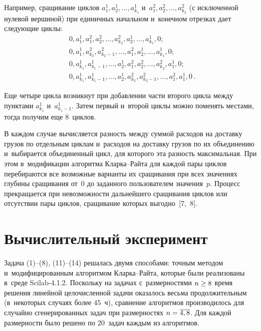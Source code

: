 \begin{multicols}{2}
  Например, сращивание циклов $a_1^1,a_2^1,\ldots, a^1_{k_1}$ и~$a_1^2,
a_2^2,\ldots, a^2_{k_2}$ (с исключенной нулевой вершиной) при единичных
начальном и~конечном отрезках дает следующие циклы:
  \begin{gather*}
  0, a_1^1, a_1^2, a_2^2,\ldots, a^2_{k_2}, a_2^1,\ldots, a^1_{k_1}, 0;\\
   0, a_1^1, a^2_{k_2}, a^2_{k_2-1},\ldots , a_1^2, a_2^1,\ldots, a^1_{k_1},0;\\
  0,a_{k_1}^1, a^1_{k_1-1}, \ldots, a_2^1, a_1^2, a_2^2,\ldots, a^2_{k_2},
a_1^1,0;\\
  0,a^1_{k_1}, a^1_{k_1-1},\ldots , a_2^1, a^2_{k_2}, a^2_{k_2-1},\ldots, a_1^2,
a_1^1,0\,.
  \end{gather*}

  Еще четыре цикла возникнут при добавлении части второго цикла между
пунктами $a^1_{k_1}$ и~$a^1_{k_1-1}$. Затем первый и~второй циклы можно
поменять мес\-та\-ми, тогда получим еще 8~циклов.

  В каждом случае вычисляется разность между суммой расходов на доставку
грузов по отдельным циклам и~расходов на доставку грузов по их
объединению и~выбирается объединенный цикл, для которого эта разность
максимальная. При этом в~модификации алгоритма Клар\-ка--Рай\-та для
каждой пары циклов перебираются все возможные варианты их сращивания
при всех значениях глубины сращивания от~0 до заданного пользователем
значения~$p$. Процесс прекращается при невозможности дальнейшего
сращивания циклов или отсутствии пары циклов, сращивание которых
выгодно~[7,~8].

\vspace*{-9pt}

\section{Вычислительный эксперимент}

\vspace*{-2pt}

  Задача (1)--(8), (11)--(14) решалась двумя способами: точным методом
и~модифицированным алгоритмом Клар\-ка--Рай\-та, которые были
реализованы в~среде Scilab-4.1.2. Поскольку на задачах с~размерностями
$n\hm\geq 8$ время решения линейной целочисленной задачи оказалось весьма
продолжительным (в~некоторых случаях более 45~ч), сравнение
алгоритмов производилось для случайно сгенерированных задач при
размерностях $n\hm=\overline{4,8}$. Для каж\-дой размерности было решено по
20~задач каж\-дым из алгоритмов.


\end{multicols}
